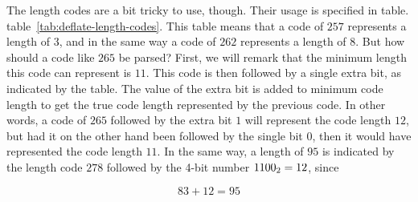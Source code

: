 The length codes are a bit tricky to use, though. Their usage is
specified in table.  table~\ref{tab:deflate-length-codes}. This table
means that a code of $257$ represents a length of $3$, and in the same
way a code of $262$ represents a length of $8$. But how should a code
like $265$ be parsed? First, we will remark that the minimum length
this code can represent is $11$. This code is then followed by a
single extra bit, as indicated by the table. The value of the extra
bit is added to minimum code length to get the true code length
represented by the previous code. In other words, a code of $265$
followed by the extra bit $1$ will represent the code length $12$, but
had it on the other hand been followed by the single bit $0$, then it
would have represented the code length $11$. In the same way, a length
of $95$ is indicated by the length code $278$ followed by the 4-bit
number $\mbox{\ensuremath{1100_2}}=12$, since

\begin{equation*}
  83 + 12 = 95
\end{equation*}

